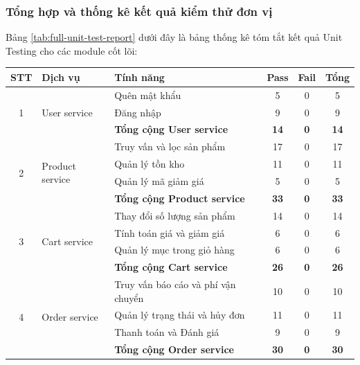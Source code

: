 \subsubsection{Tổng hợp và thống kê kết quả kiểm thử đơn vị}

Bảng \ref{tab:full-unit-test-report} dưới đây là bảng thống kê tóm tắt kết quả Unit Testing cho các module cốt lõi:

\begin{table}[H]
\centering
\small
\begin{tabular}{|c|l|l|c|c|c|}
\hline
\textbf{STT} & \textbf{Dịch vụ} & \textbf{Tính năng} & \textbf{Pass} & \textbf{Fail} & \textbf{Tổng} \\ \hline

\multirow{3}{*}{1} & \multirow{3}{*}{User service} & Quên mật khẩu & 5 & 0 & 5 \\ \cline{3-6} 
 & & Đăng nhập & 9 & 0 & 9 \\ \cline{3-6} 
 & & \textbf{Tổng cộng User service} & \textbf{14} & \textbf{0} & \textbf{14} \\ \hline

\multirow{4}{*}{2} & \multirow{4}{*}{Product service} & Truy vấn và lọc sản phẩm & 17 & 0 & 17 \\ \cline{3-6} 
 & & Quản lý tồn kho & 11 & 0 & 11 \\ \cline{3-6} 
 & & Quản lý mã giảm giá & 5 & 0 & 5 \\ \cline{3-6} 
 & & \textbf{Tổng cộng Product service} & \textbf{33} & \textbf{0} & \textbf{33} \\ \hline

\multirow{4}{*}{3} & \multirow{4}{*}{Cart service} & Thay đổi số lượng sản phẩm & 14 & 0 & 14 \\ \cline{3-6} 
 & & Tính toán giá và giảm giá & 6 & 0 & 6 \\ \cline{3-6} 
 & & Quản lý mục trong giỏ hàng & 6 & 0 & 6 \\ \cline{3-6} 
 & & \textbf{Tổng cộng Cart service} & \textbf{26} & \textbf{0} & \textbf{26} \\ \hline

\multirow{4}{*}{4} & \multirow{4}{*}{Order service} & Truy vấn báo cáo và phí vận chuyển & 10 & 0 & 10 \\ \cline{3-6} 
 & & Quản lý trạng thái và hủy đơn & 11 & 0 & 11 \\ \cline{3-6} 
 & & Thanh toán và Đánh giá & 9 & 0 & 9 \\ \cline{3-6} 
 & & \textbf{Tổng cộng Order service} & \textbf{30} & \textbf{0} & \textbf{30} \\ \hline


\end{tabular}
\end{table}

